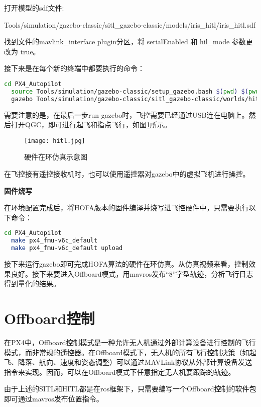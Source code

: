 打开模型的sdf文件:

Tools/simulation/gazebo-classic/sitl\_gazebo-classic/models/iris\_hitl/iris\_hitl.sdf

找到文件的mavlink\_interface plugin分区，将 serialEnabled 和 hil\_mode 参数更改为 true。

接下来是在每个新的终端中都要执行的命令：

\begin{lstlisting}[language=Bash, basicstyle=\footnotesize, linewidth=\linewidth, breaklines=true]
  cd PX4_Autopilot
  source Tools/simulation/gazebo-classic/setup_gazebo.bash $(pwd) $(pwd)/build/px4_sitl_default
  gazebo Tools/simulation/gazebo-classic/sitl_gazebo-classic/worlds/hitl_iris.world
\end{lstlisting}


需要注意的是，在最后一步run gazebo时，飞控需要已经通过USB连在电脑上。然后打开QGC，即可进行起飞和指点飞行，如图\ref{hitl}所示。
\begin{figure}[!h]
  \centering
  \texttt{[image: hitl.jpg]}
  \caption{硬件在环仿真示意图}
  \label{hitl}
\end{figure}

在飞控接有遥控接收机时，也可以使用遥控器对gazebo中的虚拟飞机进行操控。

\textbf{固件烧写}

在环境配置完成后，将HOFA版本的固件编译并烧写进飞控硬件中，只需要执行以下命令：

\begin{lstlisting}[language=Bash, basicstyle=\footnotesize, linewidth=\linewidth, breaklines=true]
  cd PX4_Autopilot
  make px4_fmu-v6c_default
  make px4_fmu-v6c_default upload
\end{lstlisting}

接下来运行gazebo即可完成HOFA算法的硬件在环仿真。从仿真视频来看，控制效果良好。接下来要进入Offboard模式，用mavros发布“8”字型轨迹，分析飞行日志得到量化的结果。

\section{Offboard控制}

在PX4中，Offboard控制模式是一种允许无人机通过外部计算设备进行控制的飞行模式，而非常规的遥控器。在Offboard模式下，无人机的所有飞行控制决策（如起飞、降落、航向、速度和姿态调整）可以通过MAVLink协议从外部计算设备发送指令来实现。因而，可以在Offboard模式下任意指定无人机要跟踪的轨迹。

由于上述的SITL和HITL都是在ros框架下，只需要编写一个Offboard控制的软件包即可通过mavros发布位置指令。

